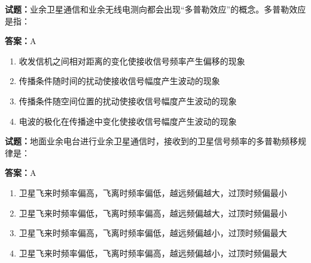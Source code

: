 \documentclass{ctexbook}
\begin{document}




\vspace{1em}

\textbf{试题：}业余卫星通信和业余无线电测向都会出现“多普勒效应”的概念。多普勒效应是指： 

\textbf{答案：}A 

\begin{enumerate}[leftmargin=3em]
  \item 收发信机之间相对距离的变化使接收信号频率产生偏移的现象 

  \item 传播条件随时间的扰动使接收信号幅度产生波动的现象 

  \item 传播条件随空间位置的扰动使接收信号幅度产生波动的现象 

  \item 电波的极化在传播途中变化使接收信号幅度产生波动的现象 

\end{enumerate}





\vspace{1em}

\textbf{试题：}地面业余电台进行业余卫星通信时，接收到的卫星信号频率的多普勒频移规律是： 

\textbf{答案：}A 

\begin{enumerate}[leftmargin=3em]
  \item 卫星飞来时频率偏高，飞离时频率偏低，越远频偏越大，过顶时频偏最小 

  \item 卫星飞来时频率偏低，飞离时频率偏高，越远频偏越大，过顶时频偏最小 

  \item 卫星飞来时频率偏高，飞离时频率偏低，越远频偏越小，过顶时频偏最大 

  \item 卫星飞来时频率偏低，飞离时频率偏高，越远频偏越小，过顶时频偏最大 

\end{enumerate}





\vspace{1em}
\end{document}
